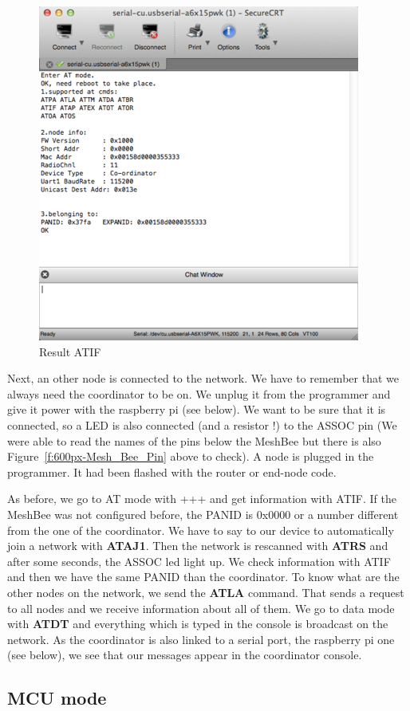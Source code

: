 \begin{figure}[ht]
\centering
\includegraphics[width=.6\linewidth]{400px-Configure_coo2}
\caption[Result ATIF]{\label{f:400px-Configure_coo2}Result ATIF}
\end{figure}

Next, an other node is connected to the network. We have to remember that we always need the coordinator to be on. We unplug it from the programmer and give it power with the raspberry pi (see below). We want to be sure that it is connected, so a LED is also connected (and a resistor !) to the ASSOC pin (We were able to read the names of the pins below the MeshBee but there is also Figure~\ref{f:600px-Mesh_Bee_Pin} above to check). A node is plugged in the programmer. It had been flashed with the router or end-node code.

As before, we go to AT mode with +++ and get information with ATIF. If the MeshBee was not configured before, the PANID is 0x0000 or a number different from the one of the coordinator. We have to say to our device to automatically join a network with \textbf{ATAJ1}. Then the network is rescanned with \textbf{ATRS} and after some seconds, the ASSOC led light up. We check information with ATIF and then we have the same PANID than the coordinator. To know what are the other nodes on the network, we send the \textbf{ATLA} command. That sends a request to all nodes and we receive information about all of them. We go to data mode with \textbf{ATDT} and everything which is typed in the console is broadcast on the network. As the coordinator is also linked to a serial port, the raspberry pi one (see below), we see that our messages appear in the coordinator console.


\subsection{MCU mode}

